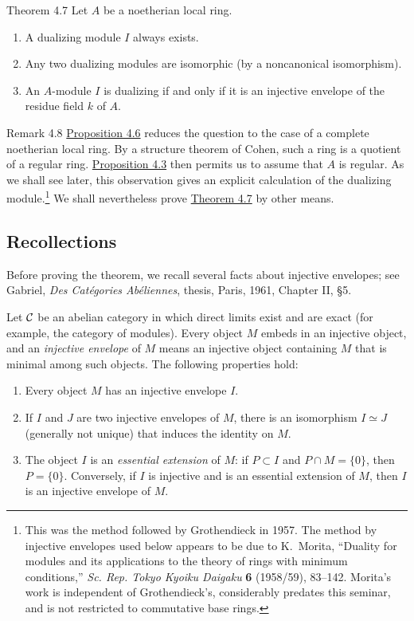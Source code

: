\begin{sgastatement}{Theorem 4.7}
Let $A$ be a noetherian local ring.
\begin{enumerate}[label=\textup{\alph*)},leftmargin=2.5em]
\item A dualizing module $I$ always exists.
\item Any two dualizing modules are isomorphic (by a noncanonical
isomorphism).
\item An $A$-module $I$ is dualizing if and only if it is an injective
envelope of the residue field $k$ of $A$.
\end{enumerate}
\end{sgastatement}

\begin{sgastatement}{Remark 4.8}
\hyperref[IV.4.6]{Proposition 4.6} reduces the question to the case of a complete noetherian
local ring. By a structure theorem of Cohen,
such a ring is a quotient of a regular ring. \hyperref[IV.4.3]{Proposition 4.3} then permits us
to assume that $A$ is regular. As we shall see later, this observation gives
an explicit calculation of the dualizing module.\footnote{This was the
method followed by Grothendieck in 1957. The method by injective envelopes
used below appears to be due to K.~Morita, ``Duality for modules and its
applications to the theory of rings with minimum conditions,''
  \emph{Sc. Rep. Tokyo Kyoiku Daigaku} \textbf{6} (1958/59), 83--142.
Morita's work is independent of Grothendieck's, considerably predates this
seminar, and is not restricted to commutative base rings.}
We shall nevertheless prove \hyperref[IV.4.7]{Theorem 4.7} by other means.
\end{sgastatement}

\subsection*{Recollections}

Before proving the theorem, we recall several facts about injective
envelopes; see Gabriel, \emph{Des Cat\'egories Ab\'eliennes}, thesis,
Paris, 1961, Chapter II, \S5.

Let $\mathcal C$ be an abelian category in which direct limits exist and are
exact
(for example, the category of modules). Every object $M$ embeds in an
injective object, and an \emph{injective envelope} of $M$ means an injective
object containing $M$ that is minimal among such objects. The following
properties hold:
\begin{enumerate}[label=\textup{\roman*)},leftmargin=2.7em]
\item Every object $M$ has an injective envelope $I$.
\item If $I$ and $J$ are two injective envelopes of $M$, there is an
isomorphism $I\simeq J$ (generally not unique) that induces the identity on
$M$.
\item The object $I$ is an \emph{essential extension} of $M$: if
$P\subset I$ and $P\cap M=\{0\}$, then $P=\{0\}$. Conversely, if $I$ is
injective and is an essential extension of $M$, then $I$ is an injective
envelope of $M$.
\end{enumerate}


